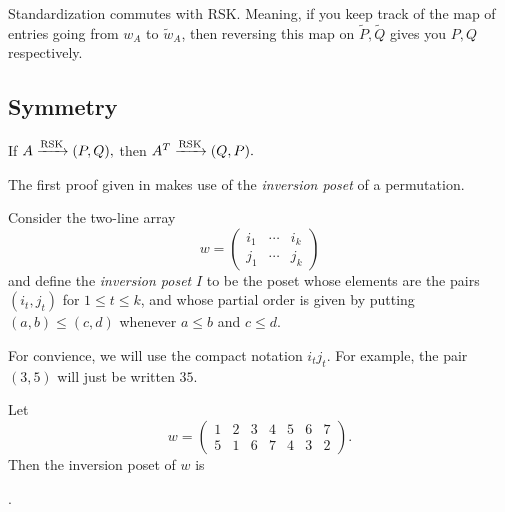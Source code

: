 \documentclass{article}
\DeclareMathOperator{\RSK}{RSK}
\newcommand{\rskarrow}{\ensuremath\xrightarrow{\RSK}}
\begin{document}
\begin{lemma}
    Standardization commutes with RSK.
    Meaning, if you keep track of the map of entries going from $w_A$ to $\widetilde{w}_A$, then reversing this map on $\widetilde{P},\widetilde{Q}$ gives you $P,Q$ respectively.
\end{lemma}

\subsection{Symmetry}

\begin{theorem}\label{thm:rsksymmetry}
    If $A \rskarrow (P,Q),$ then $A^T \rskarrow (Q,P).$
\end{theorem}

The first proof given in \cite{StanleyEC2} makes use of the \textit{inversion poset} of a permutation.

\begin{definition}
    Consider the two-line array
    \[
        w = \begin{pmatrix}
            i_1 & \cdots & i_k \\
            j_1 & \cdots & j_k
        \end{pmatrix}
    \]
    and define the \textit{inversion poset} $I$ to be the poset whose elements are the pairs $(i_t, j_t)$ for $1 \leq t \leq k$, and whose partial order is given by putting $(a,b) \leq (c,d)$ whenever $a \leq b$ and $c \leq d$.
\end{definition}

For convience, we will use the compact notation $i_tj_t$.
For example, the pair $(3,5)$ will just be written $35$.

\begin{example}\label{ex:invposet}
    Let
    \[
        w = \begin{pmatrix}
            1 & 2 & 3 & 4 & 5 & 6 & 7 \\
            5 & 1 & 6 & 7 & 4 & 3 & 2
        \end{pmatrix}.
    \]
    Then the inversion poset of $w$ is 
    \begin{center}
        .
    \end{center}
\end{example}
\end{document}
